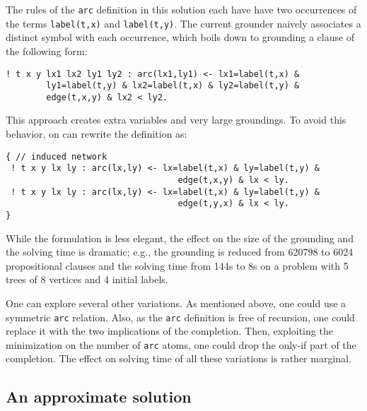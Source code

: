 \documentclass{tlp}
\renewcommand{\|}{\ensuremath{\,|\,}}
\renewcommand{\|}{\,|\,}
\newcommand{\idpcode}[1]{\lstinline{#1}}
\begin{document}
The rules of the \texttt{arc} definition in this solution each have
have two occurrences of the terms \idpcode{label(t,x)} and
\idpcode{label(t,y)}. The current grounder naively associates a
distinct symbol with each occurrence, which boils down to grounding a
clause of the following form:
\begin{lstlisting}[caption={One of the  \texttt{arc} rules after
    initial processing by the grounder.},label={fig:expandedarc}]
  ! t x y lx1 lx2 ly1 ly2 : arc(lx1,ly1) <- lx1=label(t,x) &
        ly1=label(t,y) & lx2=label(t,x) & ly2=label(t,y) &
        edge(t,x,y) & lx2 < ly2.
\end{lstlisting}

This approach creates extra variables and very large groundings. To
avoid this behavior, on can rewrite the definition as:
\begin{lstlisting}[caption={Better performing definition of
    \texttt{arc}.},label={fig:betterarc}]
{ // induced network
 ! t x y lx ly : arc(lx,ly) <- lx=label(t,x) & ly=label(t,y) &
                                  edge(t,x,y) & lx < ly.
 ! t x y lx ly : arc(lx,ly) <- lx=label(t,x) & ly=label(t,y) &
                                  edge(t,y,x) & lx < ly.
}
\end{lstlisting}
While the formulation is less elegant, the effect on the size of the
grounding and the solving time is dramatic; e.g., the grounding is
reduced from 620798 to 6024 propositional clauses and the solving
time from 144s to 8s on a problem with 5 trees of 8 vertices and 4
initial labels.

One can explore several other variations. As mentioned above, one
could use a symmetric \texttt{arc} relation. Also, as the \texttt{arc}
definition is free of recursion, one could replace it with the two
implications of the completion. Then, exploiting the minimization on
the number of \texttt{arc} atoms, one could drop the only-if part of
the completion.  The effect on solving time of all these variations is
rather marginal.

\subsection{An approximate solution}
\end{document}
